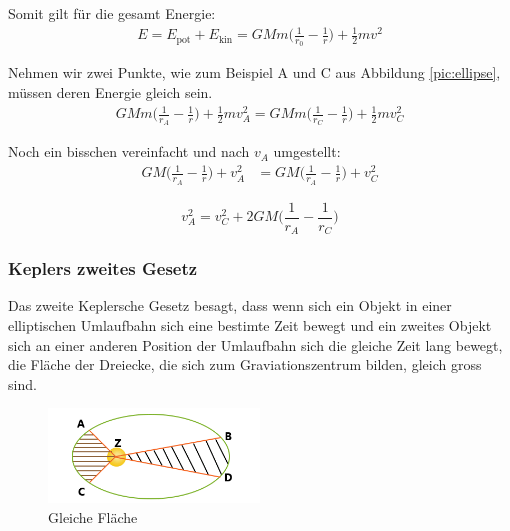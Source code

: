 \begin{refsection}
\noindent{}Somit gilt für die gesamt Energie:
\begin{align*}
E = E_{\text{pot}} + E_{\text{kin}} = GMm \biggr( \frac{1}{r_0} - \frac{1}{r}\biggr) + \frac{1}{2}mv^2
\end{align*}

\noindent{}Nehmen wir zwei Punkte, wie zum Beispiel A und C aus Abbildung \ref{pic:ellipse}, müssen deren Energie gleich sein.
\begin{align*}
GMm \biggr( \frac{1}{r_A} - \frac{1}{r}\biggr) + \frac{1}{2}mv_A^2 = GMm \biggr( \frac{1}{r_C} - \frac{1}{r}\biggr) + \frac{1}{2}mv_C^2
\end{align*}

\noindent{}Noch ein bisschen vereinfacht und nach $v_A$ umgestellt:
\begin{align*}
GM \biggr( \frac{1}{r_A} - \frac{1}{r}\biggr) + v_A^2 &= GM \biggr( \frac{1}{r_A} - \frac{1}{r}\biggr) + v_C^2
\end{align*}

\begin{equation}
v_A^2 = v_C^2 + 2GM \biggr( \frac{1}{r_A} - \frac{1}{r_C}\biggr)
\label{eq:keplerenergie}
\end{equation}

\subsubsection{Keplers zweites Gesetz}
Das zweite Keplersche Gesetz besagt, dass wenn sich ein
Objekt in einer elliptischen Umlaufbahn sich eine bestimte Zeit bewegt und ein zweites Objekt sich an einer anderen Position der Umlaufbahn sich die gleiche Zeit lang bewegt, die Fläche der Dreiecke, die sich zum Graviationszentrum bilden, gleich gross sind.
\begin{figure}[h]
\centering
\includegraphics[width=0.5\textwidth]{gps/pictures/keplersec.png}
\caption{Gleiche Fläche}
\end{figure}


\end{refsection}
